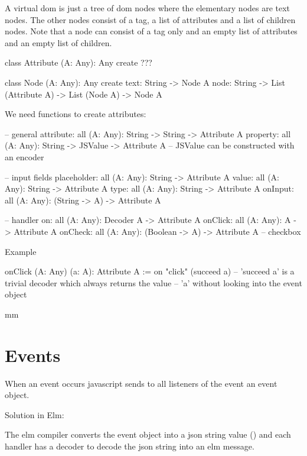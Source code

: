 A virtual dom is just a tree of dom nodes where the elementary nodes are text
nodes. The other nodes consist of a tag, a list of attributes and a list of
children nodes. Note that a node can consist of a tag only and an empty list of
attributes and an empty list of children.

\begin{alba}
    class
        Attribute (A: Any): Any
    create
        ???

    class
        Node (A: Any): Any
    create
        text: String -> Node A
        node: String -> List (Attribute A) -> List (Node A) -> Node A
\end{alba}


We need functions to create attributes:
\begin{alba}
    -- general
    attribute:   all (A: Any): String -> String -> Attribute A
    property:    all (A: Any): String -> JSValue -> Attribute A
            -- JSValue can be constructed with an encoder

    -- input fields
    placeholder: all (A: Any): String -> Attribute A
    value:       all (A: Any): String -> Attribute A
    type:        all (A: Any): String -> Attribute A
    onInput:     all (A: Any): (String -> A) -> Attribute A

    -- handler
    on:          all (A: Any): Decoder A -> Attribute A
    onClick:     all (A: Any): A -> Attribute A
    onCheck:     all (A: Any): (Boolean -> A) -> Attribute A -- checkbox
\end{alba}

Example
\begin{alba}
    onClick (A: Any) (a: A): Attribute A :=
        on "click" (succeed a)
    -- 'succeed a' is a trivial decoder which always returns the value
    -- 'a' without looking into the event object
\end{alba}




 mm
\section{Events}

When an event occurs javascript sends to all listeners of the event an event
object.

Solution in Elm:

The elm compiler converts the event object into a json string value
() and each handler has a decoder to decode the json
string into an elm message.

